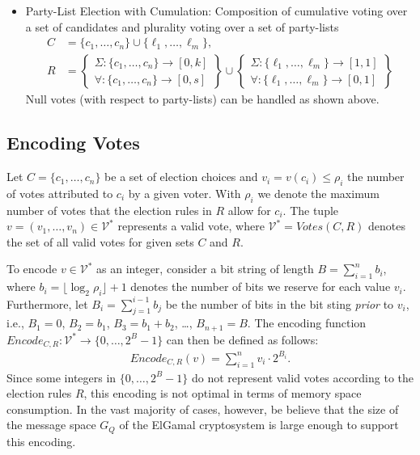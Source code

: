 \documentclass[bibtotoc,halfparskip,oneside]{scrreprt}
\begin{document}
\begin{itemize}
\item Party-List Election with Cumulation: Composition of cumulative voting over a set of candidates and plurality voting over a set of party-lists
\begin{align*}
	C&=\{c_1,\ldots,c_n\}\cup\{\ell_1,\ldots,\ell_m\},\\
	R&=\left\{\begin{aligned}\Sigma:\{c_1,\ldots,c_n\}\rightarrow[0,k] \\ \forall:\{c_1,\ldots,c_n\}\rightarrow[0,s]\end{aligned}\right\} \cup
	\left\{\begin{aligned}\Sigma:\{\ell_1,\ldots,\ell_m\}\rightarrow[1,1] \\ \forall:\{\ell_1,\ldots,\ell_m\}\rightarrow[0,1]\end{aligned}\right\}
\end{align*}
Null votes (with respect to party-lists) can be handled as shown above.
\end{itemize}


\subsection{Encoding Votes}\label{votes}

Let $C=\{c_1,\ldots,c_n\}$ be a set of election choices and $v_i=v(c_i)\leq \rho_i$ the number of votes attributed to $c_i$ by a given voter. With $\rho_i$ we denote the maximum number of votes that the election rules in $R$ allow for $c_i$. The tuple $v=(v_1,\ldots,v_n)\in\mathcal{V}^*$ represents a valid vote, where $\mathcal{V}^*=\mathit{Votes}(C,R)$ denotes the set of all valid votes for given sets $C$ and $R$.

To encode $v\in \mathcal{V}^*$ as an integer, consider a bit string of length $B=\sum_{i=1}^n b_i$, where $b_i=\lfloor\log_2\rho_i\rfloor+1$ denotes the number of bits we reserve for each value $v_i$. Furthermore, let $B_i=\sum_{j=1}^{i-1}b_j$ be the number of bits in the bit sting \emph{prior} to $v_i$, i.e., $B_1=0$, $B_2=b_1$, $B_3=b_1+b_2$, \ldots, $B_{n+1}=B$. The encoding function $\mathit{Encode}_{C,R}:\mathcal{V}^*\rightarrow \{0,\ldots,2^B{-}1\}$ can then be defined as follows:
\begin{align*}
	\mathit{Encode}_{C,R}(v) = \sum_{i=1}^n v_i\cdot 2^{B_i}.
\end{align*}
Since some integers in $\{0,\ldots,2^B{-}1\}$ do not represent valid votes according to the election rules $R$, this encoding is not optimal in terms of memory space consumption. In the vast majority of cases, however, be believe that the size of the message space $G_Q$ of the ElGamal cryptosystem is large enough to support this encoding.
\end{document}
